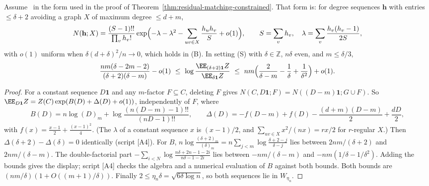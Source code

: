 \begin{proposition}
\label{prop:s3-means-not-flat}
Assume~\cite[Theorem~4.6]{McK85} in the form used in the proof of
Theorem~\ref{thm:residual-matching-constrained}. That form is: for degree sequences \(\mathbf h\)
with entries \(\le\delta+2\) avoiding a graph \(X\) of maximum degree \(\le d+m\),
\[
N(\mathbf h;X)=\frac{(S-1)!!}{\prod_vh_v!}
\exp\Bigl(-\lambda-\lambda^2-\sum_{uv\in X}\frac{h_uh_v}{S}+o(1)\Bigr),
\qquad S=\sum_vh_v,\quad \lambda=\sum_v\frac{h_v(h_v-1)}{2S},
\]
with \(o(1)\) uniform when \(\delta(d+\delta)^2/n\to0\), which holds in (B). In setting (S) with
\(\delta\in\mathbb Z\), \(n\delta\) even, and \(m\le\delta/3\),
\[
\frac{nm(\delta-2m-2)}{(\delta+2)(\delta-m)}-o(1)
\ \le\ \log\frac{\EE_{(\delta+2)\mathbf 1}Z}{\EE_{\delta\mathbf 1}Z}
\ \le\ nm\Bigl(\frac2{\delta-m}-\frac1\delta+\frac1{\delta^2}\Bigr)+o(1).
\]
\end{proposition}

\begin{proof}
For a constant sequence \(D\mathbf 1\) and any \(m\)-factor \(F\subseteq C\), deleting \(F\)
gives \(N(C,D\mathbf 1;F)=N((D-m)\mathbf 1;G\cup F)\). So
\(\EE_{D\mathbf 1}Z=Z(C)\exp(B(D)+\Delta(D)+o(1))\), independently of \(F\), where
\[
B(D)=n\log(D)_m+\log\frac{(n(D-m)-1)!!}{(nD-1)!!},\qquad
\Delta(D)=-f(D-m)+f(D)-\frac{(d+m)(D-m)}2+\frac{dD}2,
\]
with \(f(x)=\frac{x-1}2+\frac{(x-1)^2}4\). (The \(\lambda\) of a constant sequence \(x\) is
\((x-1)/2\), and \(\sum_{uv\in X}x^2/(nx)=rx/2\) for \(r\)-regular \(X\).) Then
\(\Delta(\delta+2)-\Delta(\delta)=0\) identically (script [A4]). For \(B\),
\(n\log\frac{(\delta+2)_m}{(\delta)_m}=n\sum_{j<m}\log\frac{\delta+2-j}{\delta-j}\) lies between
\(2nm/(\delta+2)\) and \(2nm/(\delta-m)\). The double-factorial part
\(-\sum_{i<N}\log\frac{n\delta+2n-1-2i}{n\delta-1-2i}\) lies between \(-nm/(\delta-m)\) and
\(-nm(1/\delta-1/\delta^2)\). Adding the bounds gives the display; script [A4] checks the
algebra and a numerical evaluation of \(B\) against both bounds. Both bounds are
\((nm/\delta)(1+O((m+1)/\delta))\). Finally \(2\le\eta_n\delta=\sqrt{6\delta\log n}\), so both
sequences lie in \(W_{\eta_n}\).
\end{proof}

